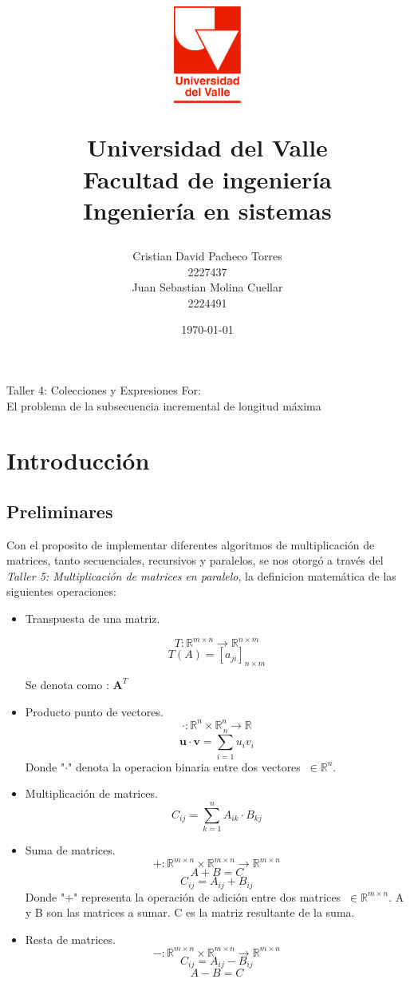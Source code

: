 \documentclass[12pt, a4paper]{article}
\title{
  \begin{figure}[th]
    \centering
    \includegraphics[width=0.2\textwidth]{Univalle}
  \end{figure}
  \textbf{Universidad del Valle
    \\{\Large Facultad de ingeniería}
  \\{\large Ingeniería en sistemas}}}
\author{Cristian David Pacheco Torres
  \\ 2227437
  \\ Juan Sebastian Molina Cuellar
  \\ 2224491}
\date{\today}
\begin{document}
{Taller 4: Colecciones y Expresiones For:
\\ El problema de la subsecuencia incremental de longitud máxima}
\newpage{}

\tableofcontents
\newpage{}
\section{Introducción}
\subsection{Preliminares}
Con el proposito de implementar diferentes algoritmos de multiplicación de matrices, tanto secuenciales, recursivos y paralelos, se nos otorgó a través del \textit{Taller 5: Multiplicación de matrices en paralelo}, la definicion matemática de las siguientes operaciones:
\begin{itemize}
  \item Transpuesta de una matriz.

    \[T: \mathbb{R}^{m \times n} \to \mathbb{R}^{n \times m} \label{eq:transpuesta} \]
  \begin{equation}
    T(A) = [a_{ji}]_{n \times m}
  \end{equation}
  
  Se denota como : $\textbf{A}^T$
  \item Producto punto de vectores.
\[
    \cdot: \mathbb{R}^n \times \mathbb{R}^n \to \mathbb{R}
\]
  \begin{equation}
    \mathbf{u} \cdot \mathbf{v} = \sum_{i=1}^{n} u_i v_i
  \end{equation}
  Donde  "$\cdot$" denota la operacion binaria entre dos vectores $~\in \mathbb{R}^n$.
  \item Multiplicación de matrices.
  \begin{equation}
    C_{ij} = \sum_{k=1}^{n} A_{ik} \cdot B_{kj}
  \end{equation}
  \item Suma de matrices.
\[
    +: \mathbb{R}^{m \times n} \times \mathbb{R}^{m \times n} \to \mathbb{R}^{m \times n}
\]
\[
    A + B = C
\]
  \begin{equation}
    C_{ij} = A_{ij} + B_{ij}
  \end{equation}
  Donde "$+$" representa la operación de adición entre dos matrices $~\in \mathbb{R}^{m \times n}$.
  A y B son las matrices a sumar.
  C es la matriz resultante de la suma.
  \item Resta de matrices.
\[
    -: \mathbb{R}^{m \times n} \times \mathbb{R}^{m \times n} \to \mathbb{R}^{m \times n}
\]
  \begin{equation}
    C_{ij} = A_{ij} - B_{ij}
  \end{equation}
\[
    A - B = C
\]
\end{itemize}
\end{document}
